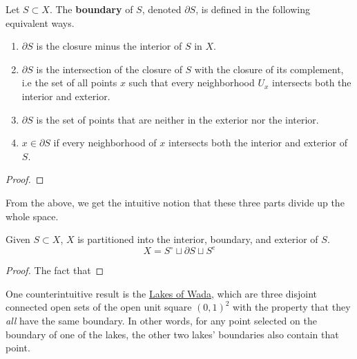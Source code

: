   \begin{definition}[Boundary]
    Let $S \subset X$. The \textbf{boundary} of $S$, denoted $\partial S$, is defined in the following equivalent ways. 
    \begin{enumerate}
      \item $\partial S$ is the closure minus the interior of $S$ in $X$. 
      \item $\partial S$ is the intersection of the closure of $S$ with the closure of its complement, i.e the set of all points $x$ such that every neighborhood $U_x$ intersects both the interior and exterior. 
      \item $\partial S$ is the set of points that are neither in the exterior nor the interior. 
      \item $x \in \partial S$ if every neighborhood of $x$ intersects both the interior and exterior of $S$. 
    \end{enumerate}
  \end{definition}
  \begin{proof}
    
  \end{proof}

  From the above, we get the intuitive notion that these three parts divide up the whole space. 

  \begin{theorem}
    Given $S \subset X$, $X$ is partitioned into the interior, boundary, and exterior of $S$. 
    \begin{equation}
      X = S^\circ \sqcup \partial S \sqcup S^e
    \end{equation}
  \end{theorem}
  \begin{proof}
    The fact that 
  \end{proof}

  One counterintuitive result is the \href{https://en.wikipedia.org/wiki/Lakes_of_Wada}{Lakes of Wada}, which are three disjoint connected open sets of the open unit square $(0, 1)^2$ with the property that they \textit{all} have the same boundary. In other words, for any point selected on the boundary of one of the lakes, the other two lakes' boundaries also contain that point. 


